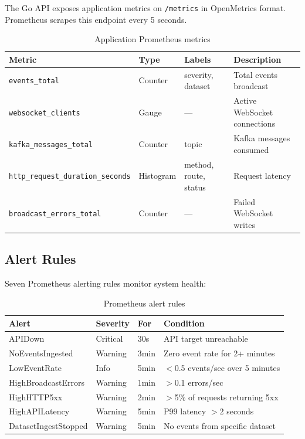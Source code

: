\documentclass[12pt,a4paper]{article}
\begin{document}
The Go API exposes application metrics on \texttt{/metrics} in OpenMetrics format. Prometheus scrapes this endpoint every 5 seconds.

\begin{table}[H]
\centering
\caption{Application Prometheus metrics}
\label{tab:metrics}
\begin{tabularx}{\textwidth}{l l l X}
\toprule
\textbf{Metric} & \textbf{Type} & \textbf{Labels} & \textbf{Description} \\
\midrule
\texttt{events\_total} & Counter & severity, dataset & Total events broadcast \\
\texttt{websocket\_clients} & Gauge & --- & Active WebSocket connections \\
\texttt{kafka\_messages\_total} & Counter & topic & Kafka messages consumed \\
\texttt{http\_request\_duration\_seconds} & Histogram & method, route, status & Request latency \\
\texttt{broadcast\_errors\_total} & Counter & --- & Failed WebSocket writes \\
\bottomrule
\end{tabularx}
\end{table}

\subsection{Alert Rules}

Seven Prometheus alerting rules monitor system health:

\begin{table}[H]
\centering
\caption{Prometheus alert rules}
\begin{tabularx}{\textwidth}{l l l X}
\toprule
\textbf{Alert} & \textbf{Severity} & \textbf{For} & \textbf{Condition} \\
\midrule
APIDown & Critical & 30s & API target unreachable \\
NoEventsIngested & Warning & 3min & Zero event rate for 2+ minutes \\
LowEventRate & Info & 5min & $<$0.5 events/sec over 5 minutes \\
HighBroadcastErrors & Warning & 1min & $>$0.1 errors/sec \\
HighHTTP5xx & Warning & 2min & $>$5\% of requests returning 5xx \\
HighAPILatency & Warning & 5min & P99 latency $>$2 seconds \\
DatasetIngestStopped & Warning & 5min & No events from specific dataset \\
\bottomrule
\end{tabularx}
\end{table}
\end{document}
